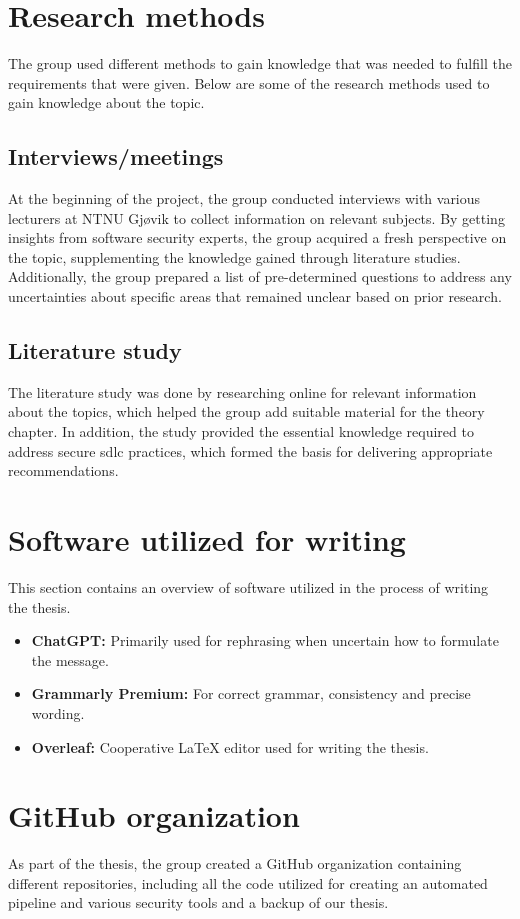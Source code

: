 \section{Research methods}
The group used different methods to gain knowledge that was needed to fulfill the requirements that were given. Below are some of the research methods used to gain knowledge about the topic. 
\newpage
\subsection{Interviews/meetings}
At the beginning of the project, the group conducted interviews with various lecturers at NTNU Gjøvik to collect information on relevant subjects. By getting insights from software security experts, the group acquired a fresh perspective on the topic, supplementing the knowledge gained through literature studies. Additionally, the group prepared a list of pre-determined questions to address any uncertainties about specific areas that remained unclear based on prior research.  

\subsection{Literature study}
The literature study was done by researching online for relevant information about the topics, which helped the group add suitable material for the theory chapter. In addition, the study provided the essential knowledge required to address secure \acrshort{sdlc} practices, which formed the basis for delivering appropriate recommendations.

\section{Software utilized for writing}
This section contains an overview of software utilized in the process of writing the thesis.
\begin{itemize}
    \item \textbf{ChatGPT:} Primarily used for rephrasing when uncertain how to formulate the message.
    \item \textbf{Grammarly Premium:} For correct grammar, consistency and precise wording.
    \item \textbf{Overleaf:} Cooperative LaTeX editor used for writing the thesis. 
\end{itemize}

\section{GitHub organization}
As part of the thesis, the group created a GitHub organization containing different repositories, including all the code utilized for creating an automated pipeline and various security tools and a backup of our thesis. 

